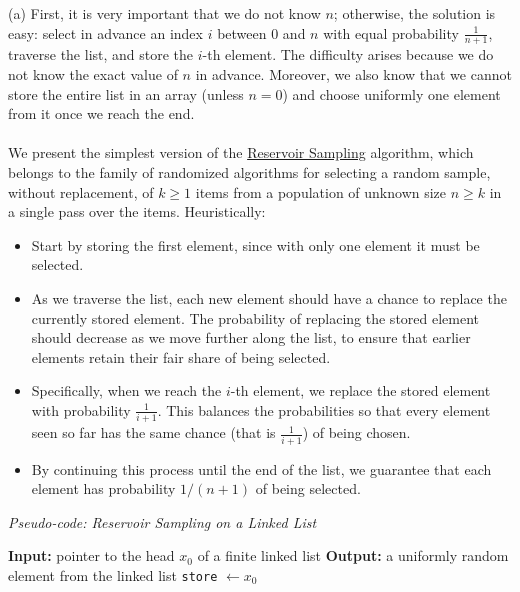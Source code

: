 \begin{solution}
    (a) First, it is very important that we do not know \( n \); otherwise, the solution is easy: select in advance an index \( i \) between \( 0 \) and \( n \) with equal probability \( \frac{1}{n+1} \), traverse the list, and store the \( i \)-th element. The difficulty arises because we do not know the exact value of \( n \) in advance. Moreover, we also know that we cannot store the entire list in an array (unless \( n=0 \)) and choose uniformly one element from it once we reach the end.
    \\\\
    We present the simplest version of the \href{https://en.wikipedia.org/wiki/Reservoir_sampling}{Reservoir Sampling} algorithm, which belongs to the family of randomized algorithms for selecting a random sample, without replacement, of \( k \geq 1 \) items from a population of unknown size \( n \geq k \) in a single pass over the items. Heuristically:
    \begin{itemize}
        \item Start by storing the first element, since with only one element it must be selected.
        \item As we traverse the list, each new element should have a chance to replace the currently stored element. The probability of replacing the stored element should decrease as we move further along the list, to ensure that earlier elements retain their fair share of being selected.
        \item Specifically, when we reach the \( i \)-th element, we replace the stored element with probability \( \frac{1}{i+1} \). This balances the probabilities so that every element seen so far has the same chance (that is \( \frac{1}{i+1} \)) of being chosen.
        \item By continuing this process until the end of the list, we guarantee that each element has probability \( 1/\left(n+1\right) \) of being selected.
    \end{itemize}
    \textit{Pseudo-code: Reservoir Sampling on a Linked List}
    {\begin{algorithm}
            \caption{ReservoirSampling(\( x_0 \))}
            \begin{algorithmic}
                \State \textbf{Input:} pointer to the head \( x_0 \) of a finite linked list
                \State \textbf{Output:} a uniformly random element from the linked list
                \State \texttt{store} \( \gets x_0 \) 

\end{algorithmic}
\end{algorithm}}
\end{solution}
